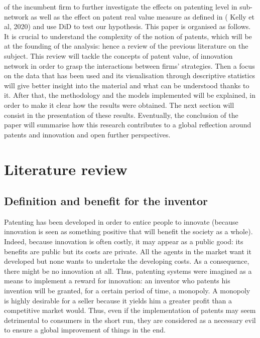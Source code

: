 \documentclass[12pt]{article}
\begin{document}
of the incumbent firm to further investigate the effects on patenting level in sub-network as well as the effect on patent real value measure as defined in ( Kelly et al, 2020) and use DiD to test our hypothesis. This paper is organised as follows.  It is crucial to understand the complexity of the notion of patents, which will be at the founding of the analysis: hence a review of the previous literature on the subject. This review will tackle the concepts of patent value, of innovation network  in order to grasp the interactions between firms' strategies. Then a focus on the data that has been used and its visualisation through descriptive statistics will give better insight into the material and what can be understood thanks to it. After that, the methodology and the models implemented will be explained, in order to make it clear how the results were obtained. The next section will consist in the presentation of these results. Eventually, the conclusion of the paper will summarise how this research contributes to a global reflection around patents and innovation and open further perspectives. 

\section{Literature review}
\subsection{Definition and benefit for the inventor}
Patenting has been developed in order to entice people to innovate (because innovation is seen as something positive that will benefit the society as a whole). Indeed, because innovation is often costly, it may appear as a public good: its benefits are public but its costs are private. All the agents in the market want it developed but none wants to undertake the developing costs. As a consequence, there might be no innovation at all. Thus, patenting systems were imagined as a means to implement a reward for innovation: an inventor who patents his invention will be granted, for a certain period of time, a monopoly. A monopoly is highly desirable for a seller because it yields him a greater profit than a competitive market would. Thus, even if the implementation of patents may seem detrimental to consumers in the short run, they are considered as a necessary evil to ensure a global improvement of things in the end. 
\end{document}
